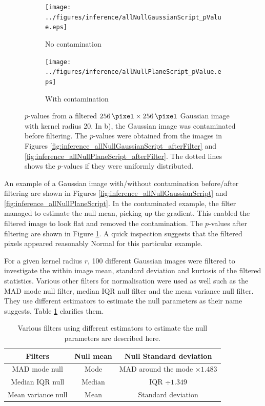 \begin{figure}
  \centering
  \begin{subfigure}[b]{\subSize}
    \texttt{[image: ../figures/inference/allNullGaussianScript\_pValue.eps]}
    \caption{No contamination}
  \end{subfigure}
  \begin{subfigure}[b]{\subSize}
    \texttt{[image: ../figures/inference/allNullPlaneScript\_pValue.eps]}
    \caption{With contamination}
  \end{subfigure}
  \caption{$p$-values from a filtered $\SI{256}{\pixel}\times \SI{256}{\pixel}$ Gaussian image with kernel radius \SI{20}{\pixel}. In b), the Gaussian image was contaminated before filtering. The $p$-values were obtained from the images in Figures \ref{fig:inference_allNullGaussianScript_afterFilter} and \ref{fig:inference_allNullPlaneScript_afterFilter}. The dotted lines shows the $p$-values if they were uniformly distributed.}
  \label{fig:inference_allNull_pValues}
\end{figure}

An example of a Gaussian image with/without contamination before/after filtering are shown in Figures \ref{fig:inference_allNullGaussianScript} and \ref{fig:inference_allNullPlaneScript}. In the contaminated example, the filter managed to estimate the null mean, picking up the gradient. This enabled the filtered image to look flat and removed the contamination. The $p$-values after filtering are shown in Figure \ref{fig:inference_allNull_pValues}. A quick inspection suggests that the filtered pixels appeared reasonably Normal for this particular example.

For a given kernel radius $r$, 100 different Gaussian images were filtered to investigate the within image mean, standard deviation and kurtosis of the filtered statistics. Various other filters for normalisation were used as well such as the MAD mode null filter, median IQR null filter and the mean variance null filter. They use different estimators to estimate the null parameters as their name suggests, Table \ref{table:inference_nullFilters} clarifies them.

\begin{table}
  \centering
  \begin{tabular}{c|c|c}
    Filters&Null mean&Null Standard deviation\\\hline
    MAD mode null&Mode&MAD around the mode $\times1.483$\\
    Median IQR null&Median&IQR $\div1.349$\\
    Mean variance null&Mean&Standard deviation
  \end{tabular}
  \caption{Various filters using different estimators to estimate the null parameters are described here.}
  \label{table:inference_nullFilters}
\end{table} 

